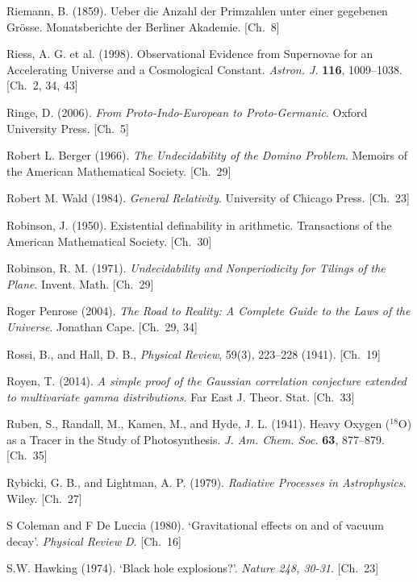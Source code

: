 \begin{list}{}{%
  \setlength{\leftmargin}{2em}%
  \setlength{\itemindent}{-2em}%
  \setlength{\itemsep}{0.35\baselineskip}%
  \setlength{\parsep}{0pt}%
  \setlength{\topsep}{0.5em}}
\item Riemann, B. (1859). Ueber die Anzahl der Primzahlen unter einer gegebenen Grösse. Monatsberichte der Berliner Akademie. \hfill {\scriptsize [Ch.~8]}
\item Riess, A. G. et al. (1998). Observational Evidence from Supernovae for an Accelerating Universe and a Cosmological Constant. \textit{Astron. J.} \textbf{116}, 1009–1038. \hfill {\scriptsize [Ch.~2, 34, 43]}
\item Ringe, D. (2006). \textit{From Proto-Indo-European to Proto-Germanic}. Oxford University Press. \hfill {\scriptsize [Ch.~5]}
\item Robert L. Berger (1966). \textit{The Undecidability of the Domino Problem}. Memoirs of the American Mathematical Society. \hfill {\scriptsize [Ch.~29]}
\item Robert M. Wald (1984). \textit{General Relativity}. University of Chicago Press. \hfill {\scriptsize [Ch.~23]}
\item Robinson, J. (1950). Existential definability in arithmetic. Transactions of the American Mathematical Society. \hfill {\scriptsize [Ch.~30]}
\item Robinson, R. M. (1971). \textit{Undecidability and Nonperiodicity for Tilings of the Plane}. Invent. Math. \hfill {\scriptsize [Ch.~29]}
\item Roger Penrose (2004). \textit{The Road to Reality: A Complete Guide to the Laws of the Universe}. Jonathan Cape. \hfill {\scriptsize [Ch.~29, 34]}
\item Rossi, B., and Hall, D. B., \textit{Physical Review}, 59(3), 223–228 (1941). \hfill {\scriptsize [Ch.~19]}
\item Royen, T. (2014). \textit{A simple proof of the Gaussian correlation conjecture extended to multivariate gamma distributions}. Far East J. Theor. Stat. \hfill {\scriptsize [Ch.~33]}
\item Ruben, S., Randall, M., Kamen, M., and Hyde, J. L. (1941). Heavy Oxygen ($^{18}$O) as a Tracer in the Study of Photosynthesis. \textit{J. Am. Chem. Soc.} \textbf{63}, 877–879. \hfill {\scriptsize [Ch.~35]}
\item Rybicki, G. B., and Lightman, A. P. (1979). \textit{Radiative Processes in Astrophysics}. Wiley. \hfill {\scriptsize [Ch.~27]}
\item S Coleman and F De Luccia (1980). `Gravitational effects on and of vacuum decay'. \textit{Physical Review D}. \hfill {\scriptsize [Ch.~16]}
\item S.W. Hawking (1974). `Black hole explosions?'. \textit{Nature 248, 30-31}. \hfill {\scriptsize [Ch.~23]}

\end{list}
